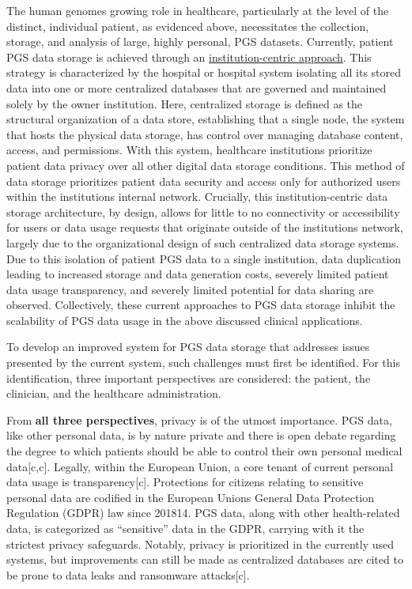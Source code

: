 \documentclass{article}
\begin{document}
The human genome\textquotesingle s growing role in healthcare, particularly at the level of the distinct, individual patient, as evidenced above, necessitates the collection, storage, and analysis of large, highly personal, PGS datasets. Currently, patient PGS data storage is achieved through an \underline{institution-centric approach}. This strategy is characterized by the hospital or hospital system isolating all its stored data into one or more centralized databases that are governed and maintained solely by the owner institution. Here, centralized storage is defined as the structural organization of a data store, establishing that a single node, the system that hosts the physical data storage, has control over managing database content, access, and permissions. With this system, healthcare institutions prioritize patient data privacy over all other digital data storage conditions. This method of data storage prioritizes patient data security and access only for authorized users within the institution\textquotesingle s internal network. Crucially, this institution-centric data storage architecture, by design, allows for little to no connectivity or accessibility for users or data usage requests that originate outside of the institution\textquotesingle s network, largely due to the organizational design of such centralized data storage systems. Due to this isolation of patient PGS data to a single institution, data duplication leading to increased storage and data generation costs, severely limited patient data usage transparency, and severely limited potential for data sharing are observed. Collectively, these current approaches to PGS data storage inhibit the scalability of PGS data usage in the above discussed clinical applications.

To develop an improved system for PGS data storage that addresses issues presented by the current system, such challenges must first be identified. For this identification, three important perspectives are considered: the patient, the clinician, and the healthcare administration.

From \textbf{all three perspectives}, privacy is of the utmost importance. PGS data, like other personal data, is by nature private and there is open debate regarding the degree to which patients should be able to control their own personal medical data[c,c]. Legally, within the European Union, a core tenant of current personal data usage is transparency[c]. Protections for citizens relating to sensitive personal data are codified in the European Union\textquotesingle s General Data Protection Regulation (GDPR) law since 201814. PGS data, along with other health-related data, is categorized as “sensitive” data in the GDPR, carrying with it the strictest privacy safeguards. Notably, privacy is prioritized in the currently used systems, but improvements can still be made as centralized databases are cited to be prone to data leaks and ransomware attacks[c]. 
\end{document}

